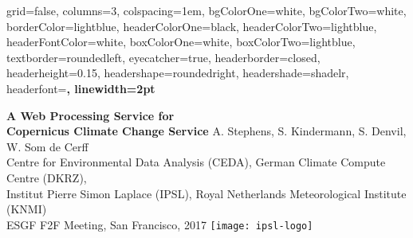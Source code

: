 \documentclass[portrait,a0paper,fontscale=0.35]{baposter} %
\begin{document}


\begin{poster}%
  {
  grid=false,
  columns=3,
  colspacing=1em,
  bgColorOne=white, %
  bgColorTwo=white, %
  borderColor=lightblue, %
  headerColorOne=black, %
  headerColorTwo=lightblue, %
  headerFontColor=white, %
  boxColorOne=white, %
  boxColorTwo=lightblue,
  textborder=roundedleft,
  eyecatcher=true, %
  headerborder=closed, %
  headerheight=0.15\textheight, %
  headershape=roundedright, %
  headershade=shadelr,
  headerfont=\Large\bf\textsc, %
  linewidth=2pt
  }
  {

  }
  {\sf\bf
          A Web Processing Service for\\ Copernicus Climate Change Service
  }
  {
    \vspace{1em} A. Stephens, S. Kindermann, S. Denvil, W. Som de Cerff\\
    {\smaller Centre for Environmental Data Analysis (CEDA),
    German Climate Compute Centre (DKRZ),\\
    Institut Pierre Simon Laplace (IPSL),
    Royal Netherlands Meteorological Institute (KNMI)\\[1em]
    ESGF F2F Meeting, San Francisco, 2017}
  }
  {
    \texttt{[image: ipsl-logo]}
  }


\end{poster}
\end{document}
